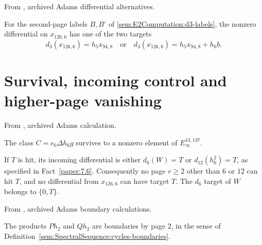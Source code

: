 \begin{theorem}
\label{sem:Computation:d3-candidates}
From \cite{LinProgram}, archived Adams differential alternatives.\par
For the second-page labels $B,B'$ of \ref{sem:E2Computation:d3-labels},
the nonzero differential on $x_{126,6}$ has one of the two targets
\[d_3(x_{126,6})=h_5x_{94,8}\quad\text{or}\quad d_3(x_{126,6})=h_5x_{94,8}+h_6b.\]

\end{theorem}

\section{Survival, incoming control and higher-page vanishing}

\begin{theorem}
\label{sem:Computation:correction-survival}
From \cite{LinProgram}, archived Adams calculation.\par
The class $C=e_0\Delta h_6g$ survives to a nonzero element of $E_\infty^{13,137}$.
\end{theorem}

\begin{theorem}
\label{sem:Computation:incoming-control}
If $T$ is hit, its incoming differential is either $d_6(W)=T$ or $d_{12}(h_6^2)=T$, as specified in Fact~\ref{paper:7.6}. Consequently no page $r\geq2$ other than $6$ or $12$ can hit $T$, and no differential from $x_{126,6}$ can have target $T$. The $d_6$ target of $W$ belongs to $\{0,T\}$.
\end{theorem}

\begin{theorem}
\label{sem:Computation:product-boundaries}
From \cite{LinProgram}, archived Adams boundary calculations.\par
The products $Ph_2$ and $Qh_2$ are boundaries by page $2$, in the sense of Definition~\ref{sem:SpectralSequence:cycles-boundaries}.
\end{theorem}

